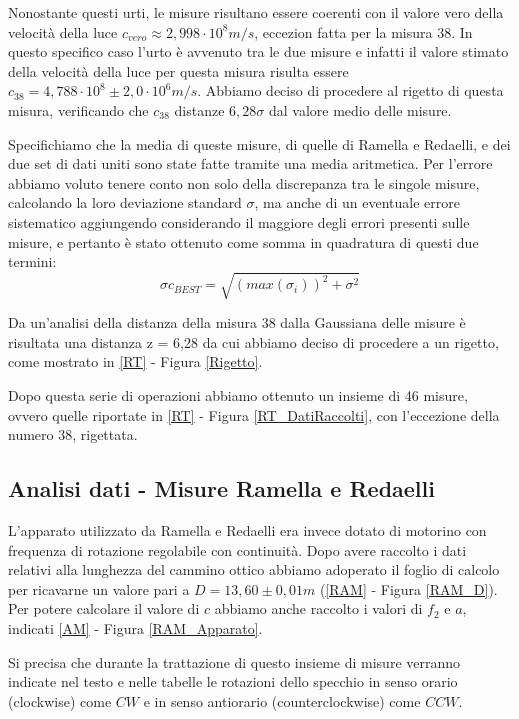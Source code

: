 \documentclass{article}
\begin{document}
Nonostante questi urti, le misure risultano essere coerenti con il valore vero della velocità della luce $c_{vero}\approx 2,998\cdot10^8 m/s$, eccezion fatta per la misura 38.
In questo specifico caso l'urto è avvenuto tra le due misure e infatti il valore stimato della velocità della luce per questa misura risulta essere $c_{38}=4,788\cdot10^8 \pm
2,0\cdot10^6 m/s$. Abbiamo deciso di procedere al rigetto di questa misura, verificando che $c_{38}$ distanze $6,28\sigma$ dal valore medio delle misure.

Specifichiamo che la media di queste misure, di quelle di Ramella e Redaelli, e dei due set di dati uniti sono state fatte tramite una media aritmetica. Per l'errore
abbiamo voluto tenere conto non solo della discrepanza tra le singole misure, calcolando la loro deviazione standard $\sigma$, ma anche di un eventuale errore sistematico aggiungendo
considerando il maggiore degli errori presenti sulle misure, e pertanto è stato ottenuto come somma in quadratura di questi due termini:
\begin{equation}
    \sigma c_{BEST} =\sqrt{(max(\sigma_{i}))^2+\sigma^2}
    \label{c_Errore}
\end{equation}

Da un'analisi della distanza della misura 38 dalla Gaussiana delle misure è risultata una distanza z = 6,28 da cui abbiamo deciso di procedere a un rigetto, come mostrato
in \ref{RT} - Figura \ref{Rigetto}.

Dopo questa serie di operazioni abbiamo ottenuto un insieme di 46 misure, ovvero quelle riportate in \ref{RT} - Figura \ref{RT_DatiRaccolti}, con l'eccezione della 
numero 38, rigettata.


\subsection{Analisi dati - Misure Ramella e Redaelli}

L'apparato utilizzato da Ramella e Redaelli era invece dotato di motorino con frequenza di rotazione regolabile con continuità. Dopo avere raccolto i dati relativi alla 
lunghezza del cammino ottico abbiamo adoperato il foglio di calcolo per ricavarne un valore pari a $D = 13,60 \pm 0,01 m$ (\ref{RAM} - Figura \ref{RAM_D}). Per potere 
calcolare il valore di $c$ abbiamo anche raccolto i valori di $f_2$ e $a$, indicati \ref{AM} - Figura \ref{RAM_Apparato}.

Si precisa che durante la trattazione di questo insieme di misure verranno indicate nel testo e nelle tabelle le rotazioni dello specchio in senso orario (clockwise) come 
$CW$ e in senso antiorario (counterclockwise) come $CCW$.
\end{document}
